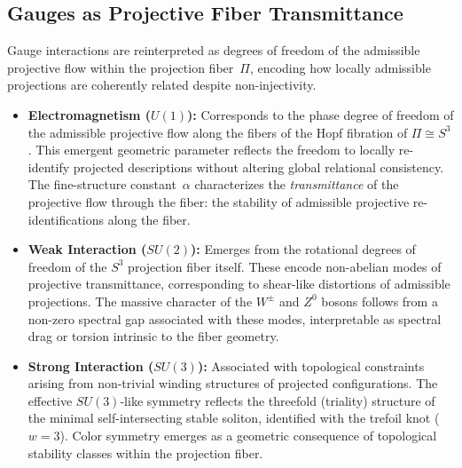 \subsection{Gauges as Projective Fiber Transmittance}
  \label{sec:gauges-transmittance}

  Gauge interactions are reinterpreted as degrees of freedom of the
  admissible projective flow within the projection fiber~$\Pi$, encoding
  how locally admissible projections are coherently related despite
  non-injectivity.

  \begin{itemize}
    \item \textbf{Electromagnetism ($U(1)$):}
    Corresponds to the phase degree of freedom of the admissible projective
    flow along the fibers of the Hopf fibration of
    $\Pi \cong S^3$.
    This emergent geometric parameter reflects the freedom to locally
    re-identify projected descriptions without altering global relational
    consistency.
    The fine-structure constant~$\alpha$ characterizes the
    \emph{transmittance} of the projective flow through the fiber:
    the stability of admissible projective re-identifications along the
    fiber.

    \item \textbf{Weak Interaction ($SU(2)$):}
    Emerges from the rotational degrees of freedom of the $S^3$
    projection fiber itself.
    These encode non-abelian modes of projective transmittance,
    corresponding to shear-like distortions of admissible projections.
    The massive character of the $W^\pm$ and $Z^0$ bosons follows from a
    non-zero spectral gap associated with these modes, interpretable as
    spectral drag or torsion intrinsic to the fiber geometry.

    \item \textbf{Strong Interaction ($SU(3)$):}
    Associated with topological constraints arising from non-trivial
    winding structures of projected configurations.
    The effective $SU(3)$-like symmetry reflects the threefold (triality)
    structure of the minimal self-intersecting stable soliton, identified
    with the trefoil knot ($w=3$).
    Color symmetry emerges as a geometric consequence of topological
    stability classes within the projection fiber.
  \end{itemize}
